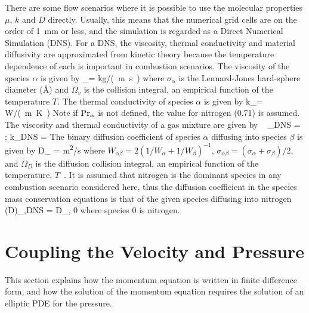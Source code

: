 There are some flow scenarios where it is possible to use the molecular properties
$\mu$, $k$ and $D$ directly. Usually, this means that the numerical grid cells are on the
order of 1~mm or less, and the simulation is regarded as a
Direct Numerical Simulation (DNS).
For a DNS, the viscosity, thermal conductivity
and material diffusivity are approximated from kinetic theory because the temperature
dependence of each is important in combustion scenarios.
The viscosity of the species $\alpha$ is given by
\be \mu_\alpha = 
\quad [=] \quad \unit{kg/(m.s)} \ee
where $\sigma_\alpha$ is the Lennard-Jones
hard-sphere diameter ($\text{\AA}$) and $\Omega_v$ is the
collision integral, an empirical function of the
temperature $T$. The thermal conductivity of species $\alpha$ is given by
\be k_\alpha =   \quad [=] \quad \unit{W/(m.K)} \ee
Note if $\hbox{Pr}_\alpha$ is not defined, the value for nitrogen (0.71) is assumed.
The viscosity and thermal conductivity of a gas mixture are given by  ~\cite{Davidson:1993}
\be \mu_{\hbox{\tiny DNS}} =   \quad ; \quad k_{\hbox{\tiny DNS}} =   \ee
The binary diffusion coefficient of species $\alpha$
diffusing into species $\beta$ is given by
\be D_{\alpha \beta} = 
\quad [=] \quad \unit{m^2/s} \ee
where $W_{\alpha \beta}=2(1/W_\alpha+1/W_\beta)^{-1}$, $\sigma_{\alpha \beta}=(\sigma_\alpha+\sigma_\beta)/2$, and
$\Omega_D$ is the diffusion collision integral, an empirical
function of the temperature, $T$~\cite{Poling:1}.
It is assumed that nitrogen is the dominant species in any combustion
scenario considered here, thus the diffusion coefficient in the
species mass conservation equations is that of the given species diffusing
into nitrogen
\be (\rho D)_{\alpha,\hbox{\tiny DNS}} = \rho \;  D_{\alpha, 0} \ee
where species 0 is nitrogen.

\newpage

\section{Coupling the Velocity and Pressure}

This section explains how the momentum equation is written in finite difference form, and how the solution of the momentum equation requires the solution of an elliptic PDE for the pressure.

